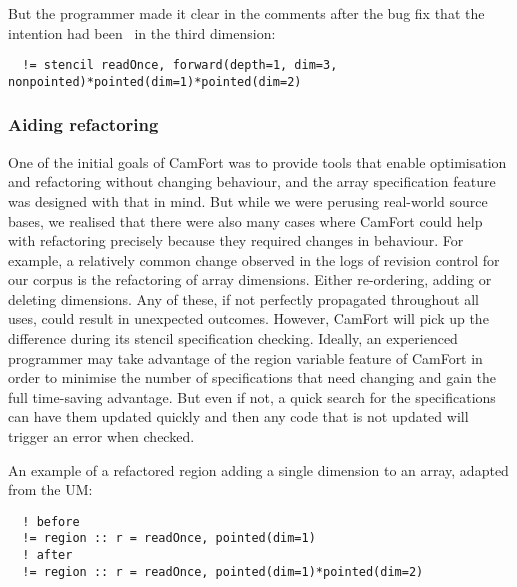 But the programmer made it clear in the comments after the bug fix
that the intention had been \forward\ in the third dimension:

\begin{verbatim}
  != stencil readOnce, forward(depth=1, dim=3, nonpointed)*pointed(dim=1)*pointed(dim=2)
\end{verbatim}


\subsubsection{Aiding refactoring}

One of the initial goals of CamFort was to provide tools that enable
optimisation and refactoring without changing behaviour, and the
array specification feature was designed with that in mind. But
while we were perusing real-world source bases, we realised that there
were also many cases where CamFort could help with refactoring
precisely because they required changes in behaviour. For example, a
relatively common change observed in the logs of revision control for
our corpus is the refactoring of array dimensions. Either
re-ordering, adding or deleting dimensions. Any of these, if not
perfectly propagated throughout all uses, could result in unexpected
outcomes. However, CamFort will pick up the difference during its
stencil specification checking. Ideally, an experienced programmer may
take advantage of the region variable feature of CamFort in order to
minimise the number of specifications that need changing and gain the
full time-saving advantage. But even if not, a quick search for the
specifications can have them updated quickly and then any code that is
not updated will trigger an error when checked.

An example of a refactored region adding a single dimension to an array, adapted from the UM:
\begin{verbatim}
  ! before
  != region :: r = readOnce, pointed(dim=1)
  ! after
  != region :: r = readOnce, pointed(dim=1)*pointed(dim=2)
\end{verbatim}


